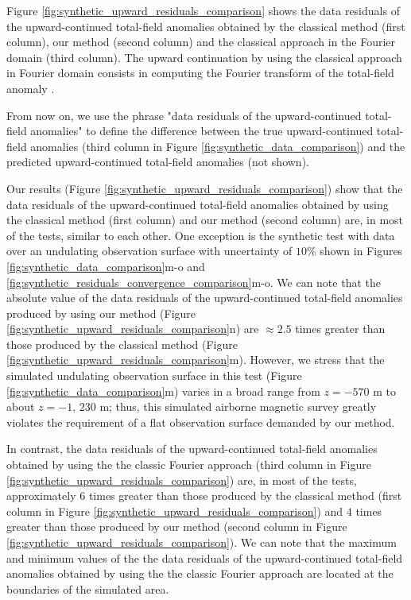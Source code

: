 Figure \ref{fig:synthetic_upward_residuals_comparison} shows the data residuals of the upward-continued total-field anomalies obtained by the classical method (first column), our method (second column) and the classical approach in the Fourier domain (third column).
The upward continuation by using the classical approach in Fourier domain consists in  
computing the Fourier transform of the total-field anomaly \citep[][ p. 317]{blakely1996}. 

From now on, we use the phrase "data residuals of the upward-continued total-field anomalies" to define the difference between the true upward-continued total-field anomalies (third column in Figure \ref{fig:synthetic_data_comparison}) and the predicted upward-continued total-field anomalies (not shown).

Our results (Figure \ref{fig:synthetic_upward_residuals_comparison}) show that the data residuals of the upward-continued total-field anomalies obtained by using the classical method (first column) and our method (second column) are, in most of the tests, similar to each other. 
One exception is the synthetic test with data over an undulating observation surface with uncertainty 
of $10\%$ shown in Figures \ref{fig:synthetic_data_comparison}m-o and 
\ref{fig:synthetic_residuals_convergence_comparison}m-o.
We can note that the absolute value of the data residuals of the upward-continued total-field anomalies produced by using our method (Figure \ref{fig:synthetic_upward_residuals_comparison}n) are $\approx 2.5$ times greater than those produced by the classical method (Figure \ref{fig:synthetic_upward_residuals_comparison}m).
However, we stress that the simulated undulating observation surface in this test  
(Figure \ref{fig:synthetic_data_comparison}m) varies in a broad range from $z = - 570$ m to about $z = -1,\, 230$ m; thus, this simulated airborne magnetic survey greatly violates the requirement 
of a flat observation surface demanded by our method.

In contrast, the data residuals of the upward-continued total-field anomalies obtained by using the 
the classic Fourier approach (third column in Figure \ref{fig:synthetic_upward_residuals_comparison})
are, in most of the tests, approximately  $6$ times greater than those produced by the classical method (first  column in Figure \ref{fig:synthetic_upward_residuals_comparison}) and $4$ times greater than those produced by
our method (second column in Figure \ref{fig:synthetic_upward_residuals_comparison}).
We can note that the maximum and minimum  values of the the data residuals of the upward-continued total-field anomalies obtained by using the the classic Fourier approach are located at the boundaries of the simulated area.

